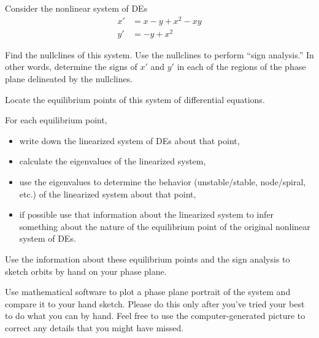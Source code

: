 \documentclass[boxes]{gsypset}
\begin{document}
	\begin{problem}
		Consider the nonlinear system of DEs
		\begin{align*}
			x' &= x - y + x^2 - xy \\
			y' &= -y + x^2
		\end{align*}
		
		\begin{subproblems}
			\subproblem 
				Find the nullclines of this system. 
				Use the nullclines to perform ``sign analysis.'' 
				In other words, determine the signs of $x'$ and $y'$ 
				in each of the regions of the phase plane delineated by the nullclines.
				\begin{solution}
					
				\end{solution}
			\subproblem Locate the equilibrium points of this system of differential equations.
				\begin{solution}
					
				\end{solution}
			\subproblem For each equilibrium point,
				\begin{itemize}
					\item write down the linearized system of DEs about that point,
					\item calculate the eigenvalues of the linearized system,
					\item 
						use the eigenvalues to determine the behavior 
						(unstable/stable, node/spiral, etc.) of the linearized system about that point,
					\item 
						if possible use that information about the linearized system to infer 
						something about the nature of the equilibrium point 
						of the original nonlinear system of DEs.
				\end{itemize}
				\begin{solution}
					
				\end{solution}
			\subproblem 
				Use the information about these equilibrium points and the sign analysis to 
				sketch orbits by hand on your phase plane.
				\begin{solution}
					
				\end{solution}
			\subproblem 
				Use mathematical software to plot a phase plane portrait of the system and 
				compare it to your hand sketch. 
				Please do this only after you've tried your best to do what you can by hand. 
				Feel free to use the computer-generated picture to correct any details 
				that you might have missed.
				\begin{solution}
					
				\end{solution}
		\end{subproblems}
	\end{problem}
	
\end{document}
